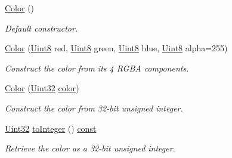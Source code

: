 \begin{DoxyCompactItemize}
\hyperlink{classsf_1_1_color_ac2eb4393fb11ad3fa3ccf34e92fe08e4}{Color} ()
\begin{DoxyCompactList}\small\item\em Default constructor. \end{DoxyCompactList}\item 
\hyperlink{classsf_1_1_color_ac791dc61be4c60baac50fe700f1c9850}{Color} (\hyperlink{namespacesf_a4ef3d630785c4f296f9b4f274c33d78e}{Uint8} red, \hyperlink{namespacesf_a4ef3d630785c4f296f9b4f274c33d78e}{Uint8} green, \hyperlink{namespacesf_a4ef3d630785c4f296f9b4f274c33d78e}{Uint8} blue, \hyperlink{namespacesf_a4ef3d630785c4f296f9b4f274c33d78e}{Uint8} alpha=255)
\begin{DoxyCompactList}\small\item\em Construct the color from its 4 R\-G\-B\-A components. \end{DoxyCompactList}\item 
\hyperlink{classsf_1_1_color_a5449f4b2b9a78230d40ce2c223c9ab2e}{Color} (\hyperlink{namespacesf_aa746fb1ddef4410bddf198ebb27e727c}{Uint32} \hyperlink{_entity_8cpp_a864889304a90873adb9c6e289a54bcf4}{color})
\begin{DoxyCompactList}\small\item\em Construct the color from 32-\/bit unsigned integer. \end{DoxyCompactList}\item 
\hyperlink{namespacesf_aa746fb1ddef4410bddf198ebb27e727c}{Uint32} \hyperlink{classsf_1_1_color_a48f75a30fc93e79390e6d700e4b4b558}{to\-Integer} () \hyperlink{term__entry_8h_a57bd63ce7f9a353488880e3de6692d5a}{const} 
\begin{DoxyCompactList}\small\item\em Retrieve the color as a 32-\/bit unsigned integer. \end{DoxyCompactList}\end{DoxyCompactItemize}
